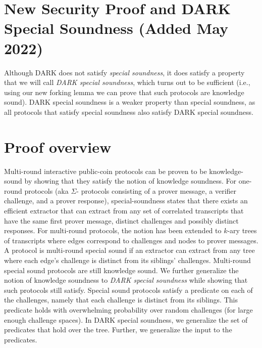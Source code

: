 \clearpage
\section*{New Security Proof and DARK Special Soundness (Added May 2022)}



Although DARK does not satisfy \emph{special soundness}, it does satisfy a property that we will call \emph{DARK special soundness}, which turns out to be sufficient (i.e., using our new forking lemma we can prove that such protocols are knowledge sound). DARK special soundness is a weaker property than special soundness, as all protocols that satisfy special soundness also satisfy DARK special soundness. 
\section{Proof overview}
Multi-round interactive public-coin protocols can be proven to be knowledge-sound by showing that they satisfy the notion of knowledge soundness. For one-round protocols (aka $\Sigma$- protocols consisting of a prover message, a verifier challenge, and a prover response), special-soundness states that there exists an efficient extractor that can extract from any set of correlated transcripts that have the same first prover message, distinct challenges and possibly distinct responses. For multi-round protocols, the notion has been extended to $k$-ary trees of transcripts where edges correspond to challenges and nodes to prover messages. A protocol is multi-round special sound if an extractor can extract from any tree where each edge's challenge is distinct from its siblings' challenges. Multi-round special sound protocols are still knowledge sound. We further generalize the notion of knowledge soundness to \emph{DARK special soundness} while showing that such protocols still satisfy. Special sound protocols satisfy a predicate on each of the challenges, namely that each challenge is distinct from its siblings. This predicate holds with overwhelming probability over random challenges (for large enough challenge spaces). In DARK special soundness, we generalize the set of predicates that hold over the tree. Further, we generalize the input to the predicates. 

